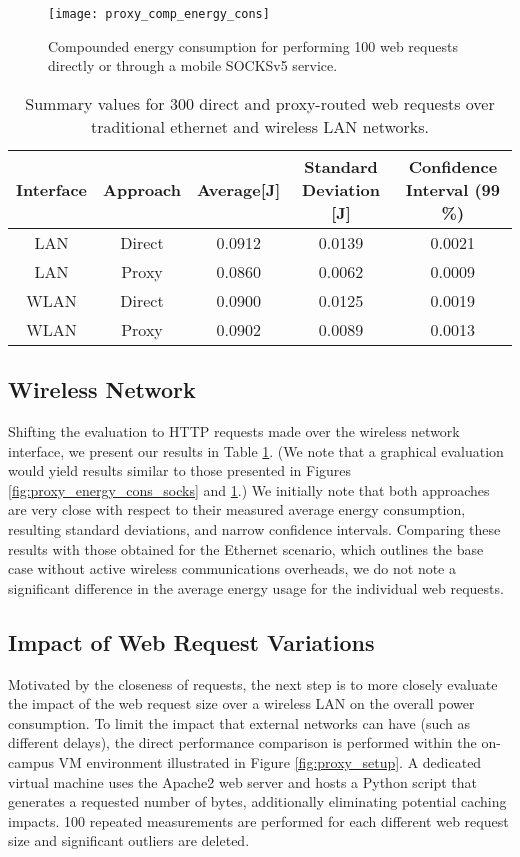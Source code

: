\begin{figure}
\centering
\texttt{[image: proxy\_comp\_energy\_cons]}
\caption{Compounded energy consumption for performing 100 web requests directly or through a mobile SOCKSv5 service.}
\label{fig:proxy_comp_energy_cons}
\end{figure}

\begin{table}[h]
\begin{tabular}{|c|c|c|c|c|}
\hline
 Interface & Approach  & Average[J]  & Standard Deviation [J] & Confidence Interval (99 \%)  \\ \hline
 LAN & Direct & 0.0912 & 0.0139 & 0.0021 \\ \hline
 LAN & Proxy & 0.0860 & 0.0062 & 0.0009 \\ \hline
 WLAN & Direct & 0.0900 & 0.0125 & 0.0019 \\ \hline
 WLAN & Proxy & 0.0902 & 0.0089 & 0.0013 \\ \hline
\end{tabular}
\caption{Summary values for 300 direct and proxy-routed web requests over traditional ethernet and wireless LAN networks.}
\label{tab:requests_summary}
\end{table}

\subsection*{Wireless Network}
Shifting the evaluation to HTTP requests made over the
wireless network interface, we present our results in Table \ref{tab:requests_summary}.
(We note that a graphical evaluation would yield results similar
to those presented in Figures \ref{fig:proxy_energy_cons_socks} and \ref{fig:proxy_comp_energy_cons}.) We initially note that
both approaches are very close with respect to their measured
average energy consumption, resulting standard deviations,
and narrow confidence intervals. \newline
Comparing these results with those obtained for the Ethernet
scenario, which outlines the base case without active wireless
communications overheads, we do not note a significant difference
in the average energy usage for the individual web
requests.

\subsection*{Impact of Web Request Variations}
Motivated by the closeness of requests, the next step is to more
closely evaluate the impact of the web request size over a
wireless LAN on the overall power consumption. To limit
the impact that external networks can have (such as different
delays), the direct performance comparison is performed within
the on-campus VM environment illustrated in Figure \ref{fig:proxy_setup}. A
dedicated virtual machine uses the Apache2 web server and
hosts a Python script that generates a requested number of
bytes, additionally eliminating potential caching impacts. 100 repeated measurements are performed for each different web request size and significant outliers are deleted.

